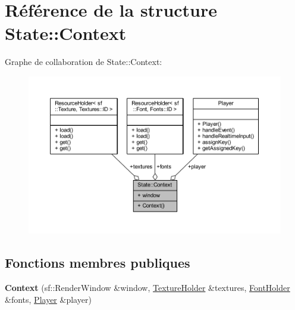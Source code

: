 \hypertarget{struct_state_1_1_context}{}\section{Référence de la structure State\+:\+:Context}
\label{struct_state_1_1_context}


Graphe de collaboration de State\+:\+:Context\+:\nopagebreak
\begin{figure}[H]
\begin{center}
\leavevmode
\includegraphics[width=350pt]{struct_state_1_1_context__coll__graph}
\end{center}
\end{figure}
\subsection*{Fonctions membres publiques}
\begin{DoxyCompactItemize}
\item 
{\bfseries Context} (sf\+::\+Render\+Window \&window, \hyperlink{class_resource_holder}{Texture\+Holder} \&textures, \hyperlink{class_resource_holder}{Font\+Holder} \&fonts, \hyperlink{class_player}{Player} \&player)\hypertarget{struct_state_1_1_context_ac8380f7873b3248c7cf32c604bbdda26}{}\label{struct_state_1_1_context_ac8380f7873b3248c7cf32c604bbdda26}

\end{DoxyCompactItemize}
